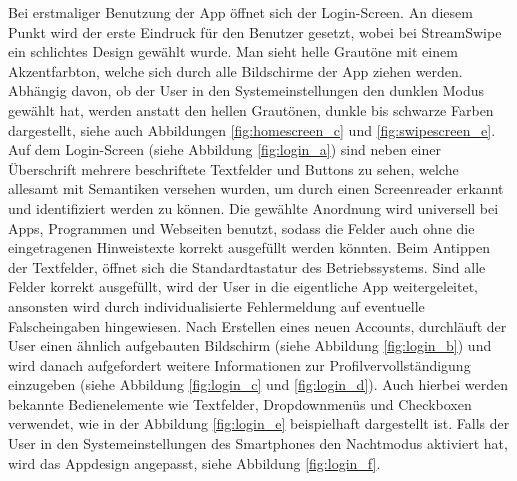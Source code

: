 Bei erstmaliger Benutzung der App öffnet sich der Login-Screen. An diesem Punkt wird der erste Eindruck für den Benutzer gesetzt, wobei bei StreamSwipe ein schlichtes Design gewählt wurde. Man sieht helle Grautöne mit einem Akzentfarbton, welche sich durch alle Bildschirme der App ziehen werden. Abhängig davon, ob der User in den Systemeinstellungen den dunklen Modus gewählt hat, werden anstatt den hellen Grautönen, dunkle bis schwarze Farben dargestellt, siehe auch Abbildungen \ref{fig:homescreen_c} und \ref{fig:swipescreen_e}.\\
Auf dem Login-Screen (siehe Abbildung \ref{fig:login_a}) sind neben einer Überschrift mehrere beschriftete Textfelder und Buttons zu sehen, welche allesamt mit Semantiken versehen wurden, um durch einen Screenreader erkannt und identifiziert werden zu können. Die gewählte Anordnung wird universell bei Apps, Programmen und Webseiten benutzt, sodass die Felder auch ohne die eingetragenen Hinweistexte korrekt ausgefüllt werden könnten. Beim Antippen der Textfelder, öffnet sich die Standardtastatur des Betriebssystems. Sind alle Felder korrekt ausgefüllt, wird der User in die eigentliche App weitergeleitet, ansonsten wird durch individualisierte Fehlermeldung auf eventuelle Falscheingaben hingewiesen. Nach Erstellen eines neuen Accounts, durchläuft der User einen ähnlich aufgebauten Bildschirm (siehe Abbildung \ref{fig:login_b}) und wird danach aufgefordert weitere Informationen zur Profilvervollständigung einzugeben (siehe Abbildung \ref{fig:login_c} und \ref{fig:login_d}). Auch hierbei werden bekannte Bedienelemente wie Textfelder, Dropdownmenüs und Checkboxen verwendet, wie in der Abbildung \ref{fig:login_e} beispielhaft dargestellt ist. Falls der User in den Systemeinstellungen des Smartphones den Nachtmodus aktiviert hat, wird das Appdesign angepasst, siehe Abbildung \ref{fig:login_f}.


